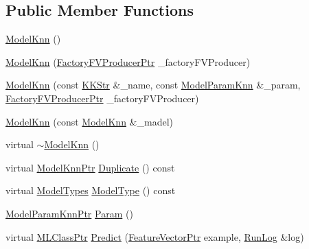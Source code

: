 \subsection*{Public Member Functions}
\begin{DoxyCompactItemize}
\item 
\hyperlink{class_k_k_m_l_l_1_1_model_knn_a9b5b6cb1ab65681122240641a288af71}{Model\+Knn} ()
\item 
\hyperlink{class_k_k_m_l_l_1_1_model_knn_a90bb8fcb6998c7d3f555712d73455acf}{Model\+Knn} (\hyperlink{namespace_k_k_m_l_l_a82812d1feb85a6cff72d059bc67bb90e}{Factory\+F\+V\+Producer\+Ptr} \+\_\+factory\+F\+V\+Producer)
\item 
\hyperlink{class_k_k_m_l_l_1_1_model_knn_adb144b477923925295d1ee1fa4c779be}{Model\+Knn} (const \hyperlink{class_k_k_b_1_1_k_k_str}{K\+K\+Str} \&\+\_\+name, const \hyperlink{class_k_k_m_l_l_1_1_model_param_knn}{Model\+Param\+Knn} \&\+\_\+param, \hyperlink{namespace_k_k_m_l_l_a82812d1feb85a6cff72d059bc67bb90e}{Factory\+F\+V\+Producer\+Ptr} \+\_\+factory\+F\+V\+Producer)
\item 
\hyperlink{class_k_k_m_l_l_1_1_model_knn_af3d02d70497a6a9abb884c3b5d278c82}{Model\+Knn} (const \hyperlink{class_k_k_m_l_l_1_1_model_knn}{Model\+Knn} \&\+\_\+madel)
\item 
virtual \hyperlink{class_k_k_m_l_l_1_1_model_knn_a5eea7e2b55ed5c349c77754e6e687c10}{$\sim$\+Model\+Knn} ()
\item 
virtual \hyperlink{class_k_k_m_l_l_1_1_model_knn_a1abfb9166a9e53ff6116716105876001}{Model\+Knn\+Ptr} \hyperlink{class_k_k_m_l_l_1_1_model_knn_abe7c276bc7ea2a3478f605c6ea383103}{Duplicate} () const 
\item 
virtual \hyperlink{class_k_k_m_l_l_1_1_model_aeda4060e088c67446ca993eefcecea06}{Model\+Types} \hyperlink{class_k_k_m_l_l_1_1_model_knn_a563d722a4cf9db5d4cc111d660d0e21c}{Model\+Type} () const 
\item 
\hyperlink{namespace_k_k_m_l_l_a9a43d46912e7043762296efe4f99bac9}{Model\+Param\+Knn\+Ptr} \hyperlink{class_k_k_m_l_l_1_1_model_knn_a11663b01826849ae7a3b8b7abb833951}{Param} ()
\item 
virtual \hyperlink{namespace_k_k_m_l_l_ac272393853d59e72e8456f14cd6d8c23}{M\+L\+Class\+Ptr} \hyperlink{class_k_k_m_l_l_1_1_model_knn_a74923dc90428817efb8f542cf3a12a82}{Predict} (\hyperlink{namespace_k_k_m_l_l_a0c5df3d48f45926fbc4fee04f5e3bc04}{Feature\+Vector\+Ptr} example, \hyperlink{class_k_k_b_1_1_run_log}{Run\+Log} \&log)
\item 

\end{DoxyCompactItemize}

